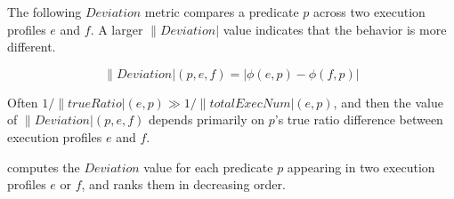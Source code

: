 The following $Deviation$ metric
compares a predicate $p$ across two execution
profiles $e$ and $f$. A larger $\|Deviation|$ value indicates that the
behavior is more different. %

\vspace{-2mm}

{\small{
\[
\|Deviation|(p, e, f) = |\phi(e, p) - \phi(f, p)|
\]
}}
\vspace{-4mm}

Often $1/\|trueRatio|(e, p) \gg 1/\|totalExecNum|(e, p)$, and
then the value of $\|Deviation|(p, e, f)$ depends primarily on $p$'s
true ratio difference between execution profiles $e$ and $f$. 





\ourtool computes the $Deviation$ value for each predicate $p$
appearing in two execution profiles $e$ or $f$, and
ranks them in decreasing order. 

